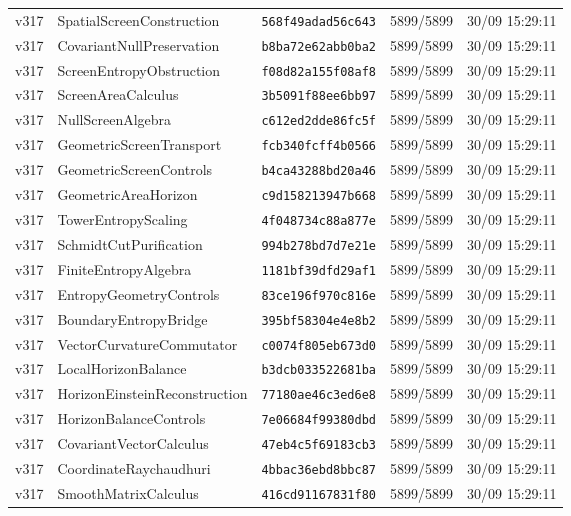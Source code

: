 \documentclass[11pt]{article}
\theoremstyle{definition}\newtheorem{deriv}{Derivation}
\begin{document}
{\begin{longtable}{@{}lllll@{}}
v317 & SpatialScreenConstruction & \texttt{568f49adad56c643} & 5899/5899 & 30/09 15:29:11 \\
v317 & CovariantNullPreservation & \texttt{b8ba72e62abb0ba2} & 5899/5899 & 30/09 15:29:11 \\
v317 & ScreenEntropyObstruction & \texttt{f08d82a155f08af8} & 5899/5899 & 30/09 15:29:11 \\
v317 & ScreenAreaCalculus & \texttt{3b5091f88ee6bb97} & 5899/5899 & 30/09 15:29:11 \\
v317 & NullScreenAlgebra & \texttt{c612ed2dde86fc5f} & 5899/5899 & 30/09 15:29:11 \\
v317 & GeometricScreenTransport & \texttt{fcb340fcff4b0566} & 5899/5899 & 30/09 15:29:11 \\
v317 & GeometricScreenControls & \texttt{b4ca43288bd20a46} & 5899/5899 & 30/09 15:29:11 \\
v317 & GeometricAreaHorizon & \texttt{c9d158213947b668} & 5899/5899 & 30/09 15:29:11 \\
v317 & TowerEntropyScaling & \texttt{4f048734c88a877e} & 5899/5899 & 30/09 15:29:11 \\
v317 & SchmidtCutPurification & \texttt{994b278bd7d7e21e} & 5899/5899 & 30/09 15:29:11 \\
v317 & FiniteEntropyAlgebra & \texttt{1181bf39dfd29af1} & 5899/5899 & 30/09 15:29:11 \\
v317 & EntropyGeometryControls & \texttt{83ce196f970c816e} & 5899/5899 & 30/09 15:29:11 \\
v317 & BoundaryEntropyBridge & \texttt{395bf58304e4e8b2} & 5899/5899 & 30/09 15:29:11 \\
v317 & VectorCurvatureCommutator & \texttt{c0074f805eb673d0} & 5899/5899 & 30/09 15:29:11 \\
v317 & LocalHorizonBalance & \texttt{b3dcb033522681ba} & 5899/5899 & 30/09 15:29:11 \\
v317 & HorizonEinsteinReconstruction & \texttt{77180ae46c3ed6e8} & 5899/5899 & 30/09 15:29:11 \\
v317 & HorizonBalanceControls & \texttt{7e06684f99380dbd} & 5899/5899 & 30/09 15:29:11 \\
v317 & CovariantVectorCalculus & \texttt{47eb4c5f69183cb3} & 5899/5899 & 30/09 15:29:11 \\
v317 & CoordinateRaychaudhuri & \texttt{4bbac36ebd8bbc87} & 5899/5899 & 30/09 15:29:11 \\
v317 & SmoothMatrixCalculus & \texttt{416cd91167831f80} & 5899/5899 & 30/09 15:29:11 \\

\end{longtable}}
\end{document}
